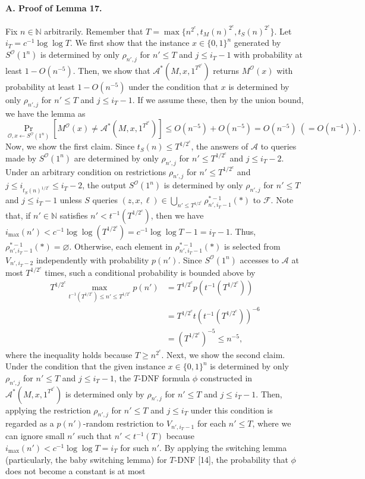 \paragraph{A. Proof of Lemma 17.}
Fix $n\in\mathbb N$ arbitrarily. Remember that $T=\max\{n^{2^c},t_M(n)^{2^c},t_S(n)^{2^c}\}$. Let $i_T=c^{-1}\log\log T$.
We first show that the instance $x\in\{0,1\}^n$ generated by $S^{\mathcal O}(1^n)$ is determined by only $\rho_{n',j}$ for $n'\leq T$ and $j\leq i_T-1$ with probability at least $1-O(n^{-5})$. Then, we show that $\mathcal A^*(M,x,1^{T^{2^c}})$ returns $M^{\mathcal O}(x)$ with probability at least $1-O(n^{-5})$ under the condition that $x$ is determined by only $\rho_{n',j}$ for $n'\leq T$ and $j\leq i_T-1$. If we assume these, then by the union bound, we have the lemma as
\[\Pr_{\mathcal O,x\leftarrow S^{\mathcal O}(1^n)}[M^{\mathcal O}(x)\neq\mathcal A^*(M,x,1^{T^{2^c}})]\leq O(n^{-5})+O(n^{-5})=O(n^{-5})\ (=O(n^{-4})).\]
Now, we show the first claim. Since $t_S(n)\leq T^{1/2^c}$, the answers of $\mathcal A$ to queries made by $S^{\mathcal O}(1^n)$ are determined by only $\rho_{n',j}$ for $n'\leq T^{1/2^c}$ and $j\leq i_T-2$. Under an arbitrary condition on restrictions $\rho_{n',j}$ for $n'\leq T^{1/2^c}$ and $j\leq i_{t_S(n)^{1/2^c}}\leq i_T-2$, the output $S^{\mathcal O}(1^n)$ is determined by only $\rho_{n',j}$ for $n'\leq T$ and $j\leq i_T-1$ unless $S$ queries $(z,x,\ell)\in\bigcup_{n'\leq T^{1/2^c}}\rho_{n',i_T-1}^{*-1}(*)$ to $\mathcal F$. Note that, if $n'\in\mathbb N$ satisfies $n'<t^{-1}(T^{1/2^c})$, then we have $i_{\max}(n')<c^{-1}\log\log(T^{1/2^c})=c^{-1}\log\log T-1=i_T-1$. Thus, $\rho_{n',i_T-1}^{*-1}(*)=\varnothing$. Otherwise, each element in $\rho_{n',i_T-1}^{*-1}(*)$ is selected from $V_{n',i_T-2}$ independently with probability $p(n')$. Since $S^{\mathcal O}(1^n)$ accesses to $\mathcal A$ at most $T^{1/2^c}$ times, such a conditional probability is bounded above by
\begin{align*}
T^{1/2^c}\max_{t^{-1}(T^{1/2^c})\leq n'\leq T^{1/2^c}}p(n')
&=T^{1/2^c}p(t^{-1}(T^{1/2^c}))\\
&=T^{1/2^c}t(t^{-1}(T^{1/2^c}))^{-6}\\
&=(T^{1/2^c})^{-5}\leq n^{-5},
\end{align*}
where the inequality holds because $T\geq n^{2^c}$.
Next, we show the second claim. Under the condition that the given instance $x\in\{0,1\}^n$ is determined by only $\rho_{n',j}$ for $n'\leq T$ and $j\leq i_T-1$, the $T$-DNF formula $\phi$ constructed in $\mathcal A^*(M,x,1^{T^{2^c}})$ is determined only by $\rho_{n',j}$ for $n'\leq T$ and $j\leq i_T-1$. Then, applying the restriction $\rho_{n',j}$ for $n'\leq T$ and $j\leq i_T$ under this condition is regarded as a $p(n')$-random restriction to $V_{n',i_T-1}$ for each $n'\leq T$, where we can ignore small $n'$ such that $n'<t^{-1}(T)$ because $i_{\max}(n')<c^{-1}\log\log T=i_T$ for such $n'$. By applying the switching lemma (particularly, the baby switching lemma) for $T$-DNF [14], the probability that $\phi$ does not become a constant is at most

